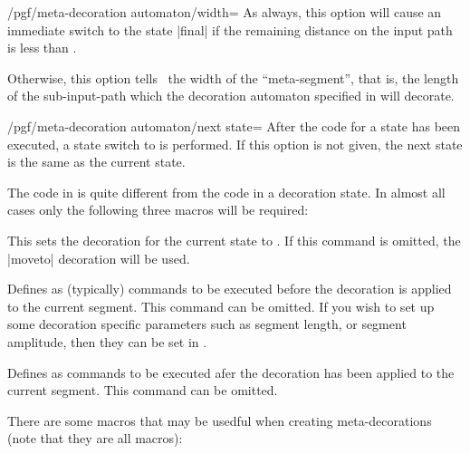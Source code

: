 \begin{command}{\pgfdeclaremetadecorate{}}
\begin{command}{\state{}}
    \begin{key}{/pgf/meta-decoration automaton/width=}
      As always, this option will cause an immediate switch to the
      state |final| if the remaining distance on the input path is less than
      . 

      Otherwise, this option tells \pgfname\ the width of the
      ``meta-segment'', that is, the length of the sub-input-path
      which the decoration automaton specified  in  will decorate.
    \end{key}
    
    \begin{key}{/pgf/meta-decoration automaton/next state=}
      After the code for a state has been executed, a state switch to
       is performed. If this option is not given, the
      next state is the same as the current state.
    \end{key}
    
    The code in  is quite different from the code in a 
    decoration state. In almost all cases only the following three
    macros will be required: 
    
    \begin{command}{\decoration{}}
      This sets the decoration for the current state to .
      If this command is omitted, the |moveto| decoration will be
      used.
    \end{command}
    
    \begin{command}{\beforedecoration{}}
      Defines  as (typically) \pgfname{} commands to be
      executed before the decoration is applied to the current segment.
      This command can be omitted.
      If you wish to set up some decoration specific parameters 
      such as segment length, or segment amplitude, then they
      can be set in .
    \end{command}
   
    \begin{command}{\afterdecoration{}}
      Defines  as commands to be executed afer the 
      decoration has been applied to the current segment.
      This command can be omitted.
    \end{command}
    
    There are some macros that may be usedful when creating 
    meta-decorations (note that they are all macros):
    

\end{command}
\end{command}
